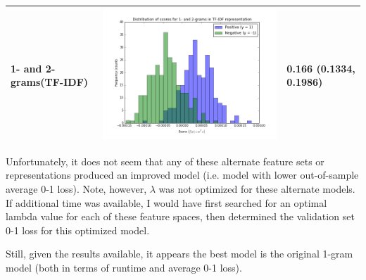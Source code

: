 \documentclass[paper=a4, fontsize=11pt]{scrartcl} %
\numberwithin{equation}{section} %
\numberwithin{figure}{section} %
\numberwithin{table}{section} %
\begin{document}
\begin{center}
\begin{tabular}{| m{3cm} | m{8cm} | m{3cm} |}
\hline
	1- and 2-grams\newline(TF-IDF) & \includegraphics[scale=0.4]{./../figures/8_2_c.png} & 0.166 \newline (0.1334, 0.1986) \\
\hline
\end{tabular}
\end{center}

Unfortunately, it does not seem that any of these alternate feature sets or representations produced an improved model (i.e. model with lower out-of-sample average 0-1 loss). Note, however, $\lambda$ was not optimized for these alternate models. If additional time was available, I would have first searched for an optimal lambda value for each of these feature spaces, then determined the validation set 0-1 loss for this optimized model.

Still, given the results available, it appears the best model is the original 1-gram model (both in terms of runtime and average 0-1 loss).
\end{document}
